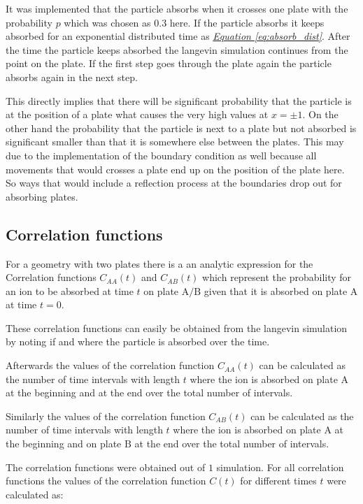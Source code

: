 \documentclass[a4paper, parskip=half]{scrartcl}
\newcommand{\myEqRef}[1]{\textit{\hyperref[eq:#1]{Equation \ref*{eq:#1}}}}
\begin{document}
It was implemented that the particle absorbs when it crosses one plate with the probability $p$ which was chosen as $0.3$ here. 
If the particle absorbs it keeps absorbed for an exponential distributed time as \myEqRef{absorb_dist}. After the time the particle keeps absorbed the langevin simulation continues from the point on the plate. If the first step goes through the plate again the particle absorbs again in the next step.

This directly implies that there will be significant probability that the particle is at the position of a plate what causes the very high values at $x = \pm 1$. On the other hand the probability that the particle is next to a plate but not absorbed is significant smaller than that it is somewhere else between the plates. This may due to the implementation of the boundary condition as well because all movements that would crosses a plate end up on the position of the plate here. So ways that would include a reflection process at the boundaries drop out for absorbing plates. 


\subsection{Correlation functions}
For a geometry with two plates there is a an analytic expression for the Correlation functions $C_{AA}(t)$ and $C_{AB}(t)$ which represent the probability for an ion to be absorbed at time $t$ on plate $\mathrm{A}/\mathrm{B}$ given that it is absorbed on plate $\mathrm{A}$ at time $t=0$.

These correlation functions can easily be obtained from the langevin simulation by noting if and where the particle is absorbed over the time. 

Afterwards the values of the correlation function $C_{AA}(t)$ can be calculated as the number of time intervals with length $t$ where the ion is absorbed on plate $\mathrm{A}$ at the beginning and at the end over the total number of intervals.

Similarly the values of the correlation function $C_{AB}(t)$ can be calculated as the number of time intervals with length $t$ where the ion is absorbed on plate $\mathrm{A}$ at the beginning and on plate $\mathrm{B}$ at the end over the total number of intervals.

The correlation functions were obtained out of $1$ simulation. For all correlation functions the values of the correlation function $C(t)$ for different times $t$ were calculated as:
\end{document}
